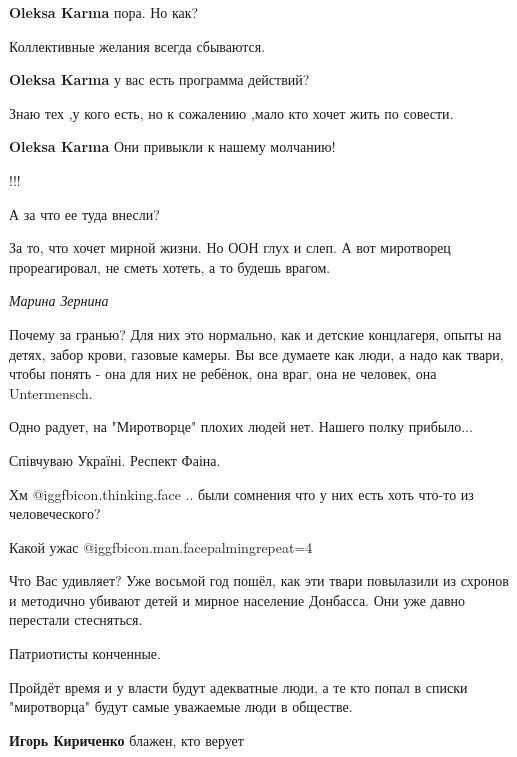 \begin{itemize}
\begin{itemize} %
\textbf{Oleksa Karma} пора. Но как?

Коллективные желания всегда сбываются.

\textbf{Oleksa Karma} у вас есть программа действий?

Знаю тех ,у кого есть, но к сожалению ,мало кто хочет жить по совести.

\textbf{Oleksa Karma} Они привыкли к нашему молчанию!
\end{itemize} %

!!!

А за что ее туда внесли?

\begin{itemize} %
За то, что хочет мирной жизни. Но ООН глух и слеп. А вот миротворец прореагировал, не сметь хотеть, а то будешь врагом.
\end{itemize} %

\emph{Марина Зернина}

Почему за гранью? Для них это нормально, как и детские концлагеря, опыты на
детях, забор крови, газовые камеры. Вы все думаете как люди, а надо как твари,
чтобы понять - она для них не ребёнок, она враг, она не человек, она
Untermensch.

Одно радует, на "Миротворце" плохих людей нет. Нашего полку прибыло...

Співчуваю Україні. Респект Фаіна.

Хм  @igg{fbicon.thinking.face} .. были сомнения что у них есть хоть что-то из человеческого?

Какой ужас  @igg{fbicon.man.facepalming}{repeat=4} 


Что Вас удивляет? Уже восьмой год пошёл, как эти твари повылазили из схронов и
методично убивают детей и мирное население Донбасса. Они уже давно перестали
стесняться.

Патриотисты конченные.

Пройдёт время и у власти будут адекватные люди, а те кто попал в списки "миротворца" будут самые уважаемые люди в обществе.

\begin{itemize} %
\textbf{Игорь Кириченко} блажен, кто верует


\end{itemize}
\end{itemize}
